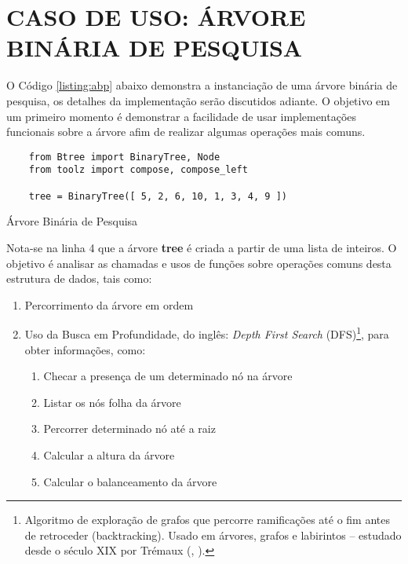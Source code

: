 \section{CASO DE USO: ÁRVORE BINÁRIA DE PESQUISA}

O Código \ref{listing:abp} abaixo demonstra a instanciação de uma árvore binária de pesquisa, os detalhes da implementação
serão discutidos adiante. O objetivo em um primeiro momento é demonstrar a facilidade de usar implementações funcionais
sobre a árvore afim de realizar algumas operações mais comuns.

\begin{listing}[!ht]
    \begin{verbatim}
    from Btree import BinaryTree, Node
    from toolz import compose, compose_left
    
    tree = BinaryTree([ 5, 2, 6, 10, 1, 3, 4, 9 ])
    \end{verbatim}
    \caption{Árvore Binária de Pesquisa}
    \label{listing:abp}
\end{listing}

Nota-se na linha 4 que a árvore \textbf{tree} é criada a partir de uma lista de inteiros. O objetivo
é analisar as chamadas e usos de funções sobre operações comuns desta estrutura de dados, tais como:

\begin{enumerate}
    \item Percorrimento da árvore em ordem
    \item Uso da Busca em Profundidade, do inglês: \textit{Depth First Search} (DFS)\footnote{
        Algoritmo de exploração de grafos que percorre ramificações até o fim antes de retroceder (backtracking). Usado em árvores, grafos e labirintos – estudado desde o século XIX por Trémaux (\citeauthor{wiki_dfs}, \citeyear{wiki_dfs})\cite{wiki_dfs}.
    }, para obter informações, como:
    \begin{enumerate}
        \item Checar a presença de um determinado nó na árvore
        \item Listar os nós folha da árvore
        \item Percorrer determinado nó até a raiz
        \item Calcular a altura da árvore
        \item Calcular o balanceamento da árvore
    \end{enumerate}
\end{enumerate}

